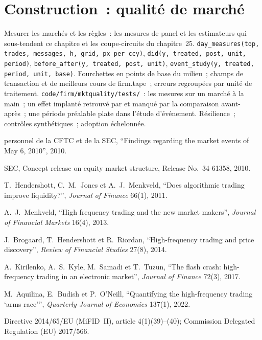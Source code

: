 \section{Construction~: qualité de marché}\label{bld:mx:market-quality-and-regulation:mktquality}

\begin{build}
 Mesurer les marchés et les règles~: les mesures de panel et les estimateurs qui sous-tendent ce chapitre et les coupe-circuits du chapitre~25.
 \texttt{day\_measures(top, trades, messages, h, grid, px\_per\_ccy)}, \texttt{did(y, treated, post, unit, period)},
\texttt{before\_after(y, treated, post, unit)}, \texttt{event\_study(y, treated, period, unit, base)}.
 Fourchettes en points de base du milieu~; champs de transaction et de meilleurs cours de firm.tape~; erreurs regroupées par unité de traitement.
 \texttt{code/firm/mktquality/tests/}~: les mesures sur un marché à la main~; un effet implanté retrouvé par 
et manqué par la comparaison avant-après~; une période préalable plate dans l'étude d'événement.
 Résilience~; contrôles synthétiques~; adoption échelonnée.
\end{build}

\begin{omsources}
\item personnel de la CFTC et de la SEC, ``Findings regarding the market events of May 6, 2010'', 2010.
\item SEC, Concept release on equity market structure, Release No.~34-61358, 2010.
\item T.~Hendershott, C.~M.~Jones et A.~J.~Menkveld, ``Does algorithmic trading improve liquidity?'', \emph{Journal of Finance} 66(1), 2011.
\item A.~J.~Menkveld, ``High frequency trading and the new market makers'', \emph{Journal of Financial Markets} 16(4), 2013.
\item J.~Brogaard, T.~Hendershott et R.~Riordan, ``High-frequency trading and price discovery'', \emph{Review of Financial Studies} 27(8), 2014.
\item A.~Kirilenko, A.~S.~Kyle, M.~Samadi et T.~Tuzun, ``The flash crash: high-frequency trading in an electronic market'', \emph{Journal of
Finance} 72(3), 2017.
\item M.~Aquilina, E.~Budish et P.~O'Neill, ``Quantifying the high-frequency trading `arms race''', \emph{Quarterly Journal of Economics} 137(1),
2022.
\item Directive 2014/65/EU (MiFID~II), article 4(1)(39)--(40); Commission Delegated Regulation (EU) 2017/566.
\end{omsources}

